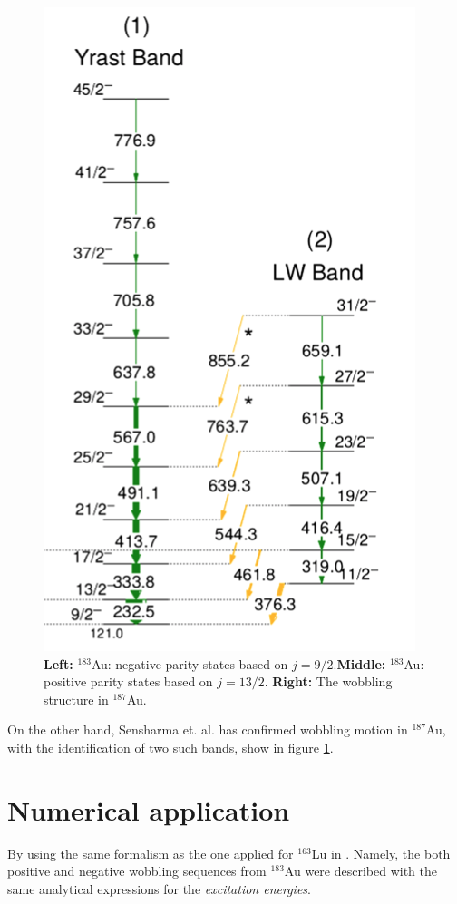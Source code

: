 \documentclass[12pt, a4paper]{article}
\begin{document}
\begin{figure}[ht]
    \includegraphics[scale=0.3]{figs/spectrum_Au187.png}
    \caption{\textbf{Left:} $^{183}$Au: negative parity states based on $j=9/2$.\textbf{Middle:} $^{183}$Au: positive parity states based on $j=13/2$. \textbf{Right:} The wobbling structure in $^{187}$Au.}
    \label{au_wobbling_bands}
\end{figure}

On the other hand, Sensharma et. al. \cite{sensharma2020} has confirmed wobbling motion in $^{187}$Au, with the identification of two such bands, show in figure \ref{au_wobbling_bands}.

\section{Numerical application}

By using the same formalism as the one applied for $^{163}$Lu in \cite{poenaru2021parity}. Namely, the both positive and negative wobbling sequences from $^{183}$Au were described with the same analytical expressions for the \textit{excitation energies}.
\end{document}
